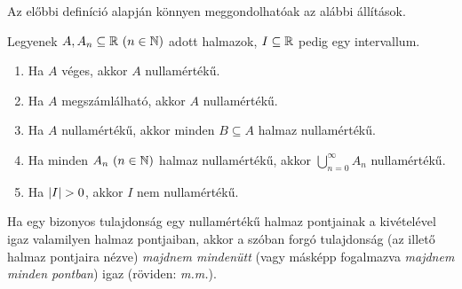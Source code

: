 \documentclass[
]{elteikthesis}[2024/04/26]
\begin{document}
	\noindent Az előbbi definíció alapján könnyen meggondolhatóak az alábbi állítások.
	
	\begin{theo*}
		Legyenek \( A, A_n \subseteq \mathbb{R} \ (n \in \mathbb{N}) \) adott halmazok,
		\( I \subseteq \mathbb{R} \) pedig egy intervallum.
		\begin{enumerate}
			\item Ha \( A \) véges, akkor \( A \) nullamértékű.
			\item Ha \( A \) megszámlálható, akkor \( A \) nullamértékű.
			\item Ha \( A \) nullamértékű, akkor minden \( B \subseteq A \) halmaz nullamértékű.
			\item Ha minden \( A_n \ (n \in \mathbb{N}) \) halmaz nullamértékű, 
			akkor \( \bigcup\limits_{n=0}^{\infty} A_n \) nullamértékű.
			\item Ha \( \abs{I} > 0 \), akkor \( I \) nem nullamértékű.
		\end{enumerate}
	\end{theo*}
	
	\newpage
	
	\noindent Ha egy bizonyos tulajdonság egy nullamértékű halmaz pontjainak a kivételével 
	igaz valamilyen halmaz pontjaiban, akkor a szóban forgó tulajdonság 
	(az illető halmaz pontjaira nézve) \textit{majdnem mindenütt}
	(vagy másképp fogalmazva \textit{majdnem minden pontban}) igaz (röviden: \textit{m.m.}).
	
\end{document}
